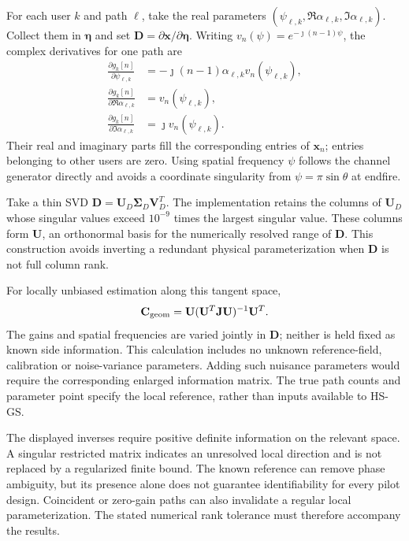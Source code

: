 \documentclass[journal]{IEEEtran}
\begin{document}
For each user $k$ and path $\ell$, take the real parameters
$(\psi_{\ell,k},\Re\alpha_{\ell,k},\Im\alpha_{\ell,k})$.
Collect them in $\boldsymbol\eta$ and set
$\mathbf D=\partial\mathbf x/\partial\boldsymbol\eta$.
Writing $v_n(\psi)=e^{-\jmath(n-1)\psi}$, the complex derivatives for
one path are
\begin{align}
\frac{\partial g_k[n]}{\partial\psi_{\ell,k}}
 &=-\jmath(n-1)\alpha_{\ell,k}v_n(\psi_{\ell,k}),\\
\frac{\partial g_k[n]}{\partial\Re\alpha_{\ell,k}}
 &=v_n(\psi_{\ell,k}),\\
\frac{\partial g_k[n]}{\partial\Im\alpha_{\ell,k}}
 &=\jmath v_n(\psi_{\ell,k}).
\end{align}
Their real and imaginary parts fill the corresponding entries of
$\mathbf x_n$; entries belonging to other users are zero. Using spatial
frequency $\psi$ follows the channel generator directly and avoids a
coordinate singularity from $\psi=\pi\sin\theta$ at endfire.

Take a thin SVD $\mathbf D=\mathbf U_D\boldsymbol\Sigma_D\mathbf V_D^T$.
The implementation retains the columns of $\mathbf U_D$ whose singular
values exceed $10^{-9}$ times the largest singular value. These columns
form $\mathbf U$, an orthonormal basis for the numerically resolved range
of $\mathbf D$. This construction avoids inverting a redundant physical
parameterization when $\mathbf D$ is not full column rank.

For locally unbiased estimation along this tangent space,
\begin{equation}
\mathbf C_{\rm geom}
=\mathbf U(\mathbf U^T\mathbf J\mathbf U)^{-1}\mathbf U^T.
\end{equation}
The gains and spatial frequencies are varied jointly in $\mathbf D$;
neither is held fixed as known side information. This calculation includes
no unknown reference-field, calibration or noise-variance parameters.
Adding such nuisance parameters would require the corresponding enlarged
information matrix. The true path counts and parameter point specify the
local reference, rather than inputs available to HS-GS.

The displayed inverses require positive definite information on the
relevant space. A singular restricted matrix indicates an unresolved
local direction and is not replaced by a regularized finite bound.
The known reference can remove phase ambiguity, but its presence alone
does not guarantee identifiability for every pilot design. Coincident or
zero-gain paths can also invalidate a regular local parameterization.
The stated numerical rank tolerance must therefore accompany the results.
\end{document}
